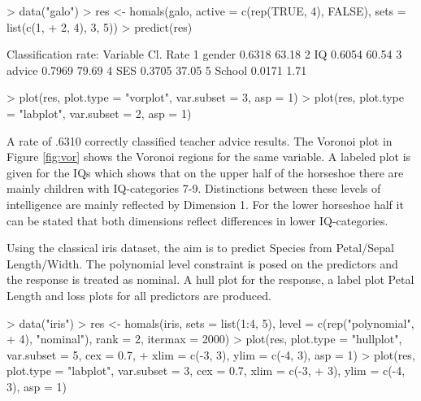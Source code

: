 \documentclass[article, nojss]{jss}
\begin{document}
\begin{Schunk}
\begin{Sinput}
> data("galo")
> res <- homals(galo, active = c(rep(TRUE, 4), FALSE), sets = list(c(1, 
+     2, 4), 3, 5))
> predict(res)
\end{Sinput}
\begin{Soutput}
Classification rate:
  Variable Cl. Rate %
1   gender   0.6318     63.18
2       IQ   0.6054     60.54
3   advice   0.7969     79.69
4      SES   0.3705     37.05
5   School   0.0171      1.71
\end{Soutput}
\end{Schunk}
\begin{Schunk}
\begin{Sinput}
> plot(res, plot.type = "vorplot", var.subset = 3, asp = 1)
> plot(res, plot.type = "labplot", var.subset = 2, asp = 1)
\end{Sinput}
\end{Schunk}

A rate of .6310 correctly classified teacher advice results. The Voronoi plot in Figure \ref{fig:vor} shows the Voronoi regions for the same variable. A labeled plot is given for the IQs which shows that on the upper half of the horseshoe there are mainly children with IQ-categories 7-9. Distinctions between these levels of intelligence are mainly reflected by Dimension 1. For the lower horseshoe half it can be stated that both dimensions reflect differences in lower IQ-categories.

Using the classical iris dataset, the aim is to predict Species from Petal/Sepal Length/Width. The polynomial level constraint is posed on the predictors and the response is treated as nominal. A hull plot for the response, a label plot Petal Length and loss plots for all predictors are produced.

\begin{Schunk}
\begin{Sinput}
> data("iris")
> res <- homals(iris, sets = list(1:4, 5), level = c(rep("polynomial", 
+     4), "nominal"), rank = 2, itermax = 2000)
> plot(res, plot.type = "hullplot", var.subset = 5, cex = 0.7, 
+     xlim = c(-3, 3), ylim = c(-4, 3), asp = 1)
> plot(res, plot.type = "labplot", var.subset = 3, cex = 0.7, xlim = c(-3, 
+     3), ylim = c(-4, 3), asp = 1)
\end{Sinput}
\end{Schunk}
\end{document}
